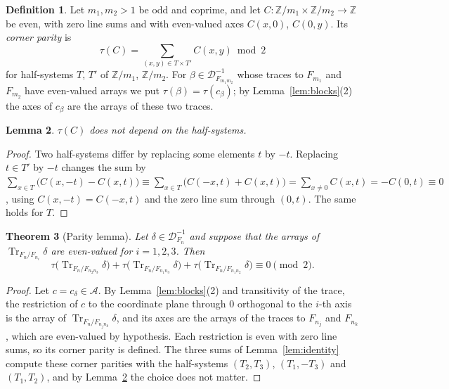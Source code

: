 \documentclass[11pt]{amsart}
\newcommand{\Z}{\mathbb{Z}}
\newcommand{\cod}[1]{\mathcal{D}_{#1}^{-1}}
\DeclareMathOperator{\Tr}{Tr}
\theoremstyle{plain}
\newtheorem{theorem}{Theorem}[section]
\newtheorem{lemma}[theorem]{Lemma}
\theoremstyle{definition}
\newtheorem{definition}[theorem]{Definition}
\begin{document}
\begin{definition}\label{def:tau}
Let $m_1, m_2 > 1$ be odd and coprime, and let $C\colon \Z/m_1 \times \Z/m_2 \to \Z$ be even,
with zero line sums and with even-valued axes $C(x,0)$, $C(0,y)$. Its \emph{corner parity} is
\[
  \tau(C) = \sum_{(x,y) \in T \times T'} C(x,y) \bmod 2
\]
for half-systems $T$, $T'$ of $\Z/m_1$, $\Z/m_2$. For $\beta \in \cod{F_{m_1m_2}}$ whose traces to
$F_{m_1}$ and $F_{m_2}$ have even-valued arrays we put $\tau(\beta) = \tau(c_\beta)$; by
Lemma~\ref{lem:blocks}(2) the axes of $c_\beta$ are the arrays of these two traces.
\end{definition}

\begin{lemma}\label{lem:tau-welldefined}
$\tau(C)$ does not depend on the half-systems.
\end{lemma}

\begin{proof}
Two half-systems differ by replacing some elements $t$ by $-t$. Replacing $t \in T'$ by $-t$
changes the sum by $\sum_{x \in T}\bigl(C(x,-t) - C(x,t)\bigr) \equiv \sum_{x \in T}\bigl(C(-x,t)
+ C(x,t)\bigr) = \sum_{x \neq 0} C(x,t) = -C(0,t) \equiv 0$, using $C(x,-t) = C(-x,t)$ and the
zero line sum through $(0,t)$. The same holds for $T$.
\end{proof}

\begin{theorem}[Parity lemma]\label{thm:parity}
Let $\delta \in \cod{F_n}$ and suppose that the arrays of $\Tr_{F_n/F_{n_i}}\delta$ are
even-valued for $i = 1, 2, 3$. Then
\[
  \tau\bigl(\Tr_{F_n/F_{n_2n_3}}\delta\bigr) + \tau\bigl(\Tr_{F_n/F_{n_1n_3}}\delta\bigr)
  + \tau\bigl(\Tr_{F_n/F_{n_1n_2}}\delta\bigr) \equiv 0 \pmod 2 .
\]
\end{theorem}

\begin{proof}
Let $c = c_\delta \in \mathcal{A}$. By Lemma~\ref{lem:blocks}(2) and transitivity of the trace, the
restriction of $c$ to the coordinate plane through $0$ orthogonal to the $i$-th axis is the array
of $\Tr_{F_n/F_{n_jn_k}}\delta$, and its axes are the arrays of the traces to $F_{n_j}$ and
$F_{n_k}$, which are even-valued by hypothesis. Each restriction is even with zero line sums, so
its corner parity is defined. The three sums of Lemma~\ref{lem:identity} compute these corner
parities with the half-systems $(T_2,T_3)$, $(T_1,-T_3)$ and $(T_1,T_2)$, and by
Lemma~\ref{lem:tau-welldefined} the choice does not matter.
\end{proof}
\end{document}
